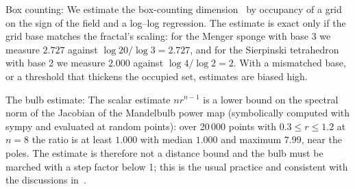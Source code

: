 \documentclass[11pt,a4paper]{article}
\theoremstyle{remark}
\begin{document}
Box counting: We estimate the box-counting dimension~\cite{falconer2014} by occupancy of a grid on the sign of the field and a log--log regression.  The estimate is exact only if the grid base matches the fractal's scaling: for the Menger sponge with base 3 we measure $2.727$ against $\log20/\log3=2.727$, and for the Sierpinski tetrahedron with base 2 we measure $2.000$ against $\log4/\log2=2$.  With a mismatched base, or a threshold that thickens the occupied set, estimates are biased high.

The bulb estimate: The scalar estimate $n r^{n-1}$ is a lower bound on the spectral norm of the Jacobian of the Mandelbulb power map (symbolically computed with sympy and evaluated at random points): over 20\,000 points with $0.3\le r\le1.2$ at $n=8$ the ratio is at least $1.000$ with median $1.000$ and maximum $7.99$, near the poles.  The estimate is therefore not a distance bound and the bulb must be marched with a step factor below 1; this is the usual practice and consistent with the discussions in~\cite{hvidtfeldt_de,quilez_distance}.





\end{document}
